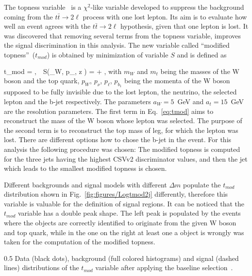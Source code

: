 The topness variable~\cite{Graesser:2012qy} is a $\chi^{2}$-like variable developed to suppress the background coming from the $t \bar{t} \to 2\ell$ process with one lost lepton. Its aim is to evaluate how well an event agrees with the $t \bar{t} \to 2\ell$ hypothesis, given that one lepton is lost. It was discovered that removing several terms from the topness variable, improves the signal discrimination in this analysis. The new variable called ``modified topness''~($t_{mod}$) is obtained by minimization of variable $S$ and is defined as 


{
 t_{mod} = ,~~S(_{W}, p_{\nu, z} ) =  + ,
}
with $m_{W}$ and  $m_{t}$ being the masses of the W boson and the top quark, ${p}_{W}$, ${p}_{\nu}$, ${p}_{\ell}$, ${p}_{b_{1}}$ being the momenta of the W boson supposed to be fully invisible due to the lost lepton, the neutrino, the selected lepton and the b-jet respectively. The parameters $a_{W} =5$~GeV and $a_{t}=15$~GeV are the resolution parameters. The first term in Eq.~\ref{eq:tmod} aims to reconstruct the mass of the W boson whose lepton was selected. The purpose of the second term is to reconstruct the top mass of leg, for which the lepton was lost. There are different options how to chose the  b-jet in the event. For this analysis the following procedure was chosen: The modified topness is computed for the three jets having the highest CSVv2 discriminator values, and then the jet which leads to the smallest modified topness is chosen.

Different backgrounds and signal models with different $\Delta m$ populate the $t_{mod}$ distribution shown in Fig.~\ref{fig:figures/Logtmod2j} differently, therefore this variable is valuable for the definition of signal regions. It can be noticed that the $t_{mod}$ variable has a double peak shape. The left peak is populated by the events where the objects are correctly identified to originate from the given W boson and top quark, while in the one on the right at least one a object is wrongly was taken for the computation of the modified topness.

                 {0.5}       %
                 { Data (black dots), background (full colored histograms) and signal (dashed lines) distributions of the $t_{mod}$  variable after applying the baseline selection~\cite{website:stopSupp}. }

